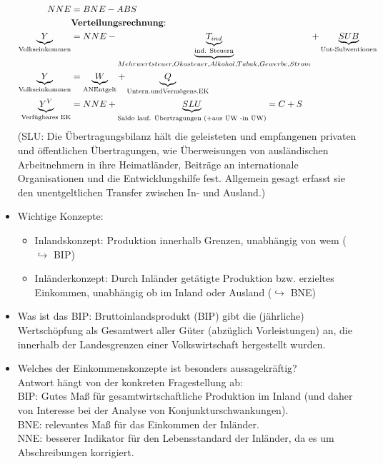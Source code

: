 \documentclass{scrartcl}
\begin{document}
\begin{itemize}
\begin{align*}
      NNE &= BNE - ABS\\
&\text{\textbf{Verteilungsrechnung}:}\\
      \underbrace{Y}_\text{Volkseinkommen} &= NNE - \underbrace{\underbrace{T_{ind}}_\text{ind. Steuern}}_{Mehrwertsteuer, Okosteuer, Alkohol, Tabak, Gewerbe, Strom} + \underbrace{SUB}_\text{Unt-Subventionen}\\
      \underbrace{Y}_\text{Volkseinkommen} & = \underbrace{W}_\text{ANEntgelt} + \underbrace{Q}_\text{Untern.undVerm\"{o}gens.EK}\\
      \underbrace{Y^V}_\text{Verf\"{u}gbares EK} &= NNE + \underbrace{SLU}_\text{Saldo lauf. \"{U}bertragungen (+aus \"{U}W -in \"{U}W)} = C + S
    \end{align*}
    (SLU: Die \"{U}bertragungsbilanz h\"{a}lt die geleisteten und empfangenen privaten und \"{o}ffentlichen \"{U}bertragungen, wie \"{U}berweisungen von ausl\"{a}ndischen Arbeitnehmern in ihre Heimatl\"{a}nder, Beitr\"{a}ge an internationale Organisationen und die Entwicklungshilfe fest. Allgemein gesagt erfasst sie den unentgeltlichen Transfer zwischen In- und Ausland.)
\item Wichtige Konzepte:
    \begin{itemize}
        \item Inlandskonzept: Produktion innerhalb Grenzen, unabh\"{a}ngig von wem ($\hookrightarrow$ BIP)
        \item Inl\"{a}nderkonzept: Durch Inl\"{a}nder get\"{a}tigte Produktion bzw. erzieltes Einkommen, unabh\"{a}ngig ob im Inland oder Ausland ($\hookrightarrow$ BNE)
      \end{itemize}
\item Was ist das BIP: Bruttoinlandsprodukt (BIP) gibt die (j\"{a}hrliche) Wertsch\"{o}pfung als Gesamtwert aller G\"{u}ter (abz\"{u}glich Vorleistungen) an, die innerhalb der Landesgrenzen einer Volkswirtschaft hergestellt wurden.
\item Welches der Einkommenskonzepte ist besonders aussagekr\"{a}ftig?\\
Antwort h\"{a}ngt von der konkreten Fragestellung ab:\\
BIP: Gutes Ma{\ss} f\"{u}r gesamtwirtschaftliche Produktion im Inland (und daher von Interesse bei der Analyse von Konjunkturschwankungen).\\
BNE: relevantes Ma{\ss} f\"{u}r das Einkommen der Inl\"{a}nder.\\
NNE: besserer Indikator f\"{u}r den Lebensstandard der Inl\"{a}nder, da es um Abschreibungen korrigiert.\\

\end{itemize}
\end{document}
